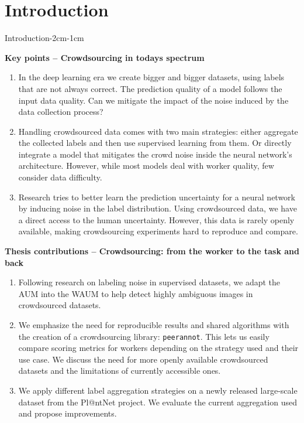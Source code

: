 \chapter{Introduction}
\enlargethispage{3\baselineskip}

\begin{keypointstwomargins}{Introduction}{-2cm}{-1cm}

        \textbf{Key points -- Crowdsourcing in todays spectrum}
        \begin{enumerate}[leftmargin=*]

        \item In the deep learning era we create bigger and bigger datasets, using labels that are not always correct. The prediction quality of a model follows the input data quality. Can we mitigate the impact of the noise induced by the data collection process?

        \item Handling crowdsourced data comes with two main strategies: either aggregate the collected labels and then use supervised learning from them. Or directly integrate a model that mitigates the crowd noise inside the neural network's architecture. However, while most models deal with worker quality, few consider data difficulty.

        \item Research tries to better learn the prediction uncertainty for a neural network by inducing noise in the label distribution. Using crowdsourced data, we have a direct access to the human uncertainty. However, this data is rarely openly available, making crowdsourcing experiments hard to reproduce and compare.

        \end{enumerate}

        \textbf{Thesis contributions -- Crowdsourcing: from the worker to the task and back}
        \begin{enumerate}[leftmargin=*,start=4]
        \item Following research on labeling noise in supervised datasets, we adapt the AUM into the WAUM to help detect highly ambiguous images in crowdsourced datasets.

        \item We emphasize the need for reproducible results and shared algorithms with the creation of a crowdsourcing library: \texttt{peerannot}. This lets us easily compare scoring metrics for workers depending on the strategy used and their use case. We discuss the need for more openly available crowdsourced datasets and the limitations of currently accessible ones.

        \item We apply different label aggregation strategies on a newly released large-scale dataset from the Pl@ntNet project. We evaluate the current aggregation used and propose improvements.
        \end{enumerate}

\end{keypointstwomargins}

